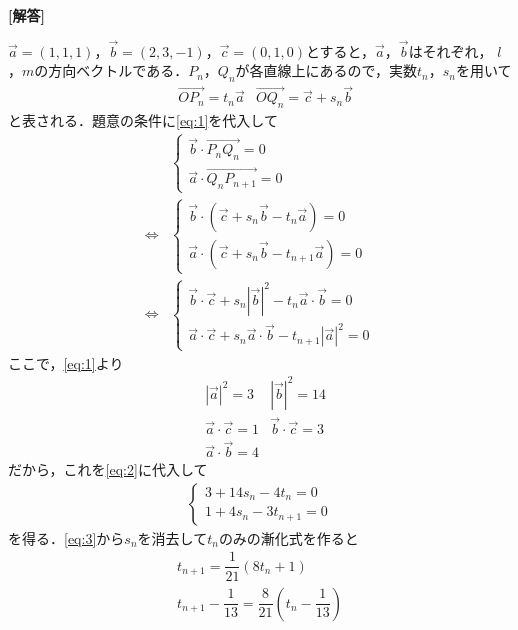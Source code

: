 \documentclass[../../main.tex]{subfiles}
\begin{document}
\begin{oframed}
  
\end{oframed}

{\bf [解答]}

$\vec{a}=(1,1,1)$，$\vec{b}=(2,3,-1)$，$\vec{c}=(0,1,0)$とすると，$\vec{a}$，$\vec{b}$はそれぞれ，
$l$，$m$の方向ベクトルである．$P_n$，$Q_n$が各直線上にあるので，実数$t_n$，$s_n$を用いて
\begin{align}
  &\overrightarrow{OP_n}=t_n\vec{a}&\overrightarrow{OQ_n}=\vec{c}+s_n\vec{b} \label{eq:1}
\end{align}
と表される．題意の条件に\cref{eq:1}を代入して
\begin{align}
  &
  \begin{cases}\displaystyle
    \vec{b}\cdot\overrightarrow{P_nQ_n}=0 \\
    \vec{a}\cdot\overrightarrow{Q_nP_{n+1}}=0
  \end{cases}\nonumber \\
  \Longleftrightarrow
  &
  \begin{cases}\displaystyle
    \vec{b}\cdot(\vec{c}+s_n\vec{b}-t_n\vec{a})=0 \\
    \vec{a}\cdot(\vec{c}+s_n\vec{b}-t_{n+1}\vec{a})=0
  \end{cases}\nonumber \\
  \Longleftrightarrow
  &
  \begin{cases}\displaystyle
    \vec{b}\cdot\vec{c}+s_n|\vec{b}|^2-t_n\vec{a}\cdot\vec{b}=0 \\
    \vec{a}\cdot\vec{c}+s_n\vec{a}\cdot\vec{b}-t_{n+1}|\vec{a}|^2=0
  \end{cases}\label{eq:2}
\end{align}
ここで，\cref{eq:1}より
\begin{align}
  &|\vec{a}|^2=3&|\vec{b}|^2=14 \\
  &\vec{a}\cdot\vec{c}=1&\vec{b}\cdot\vec{c}=3 \\
  &\vec{a}\cdot\vec{b}=4
\end{align}
だから，これを\cref{eq:2}に代入して
\begin{align}
  \begin{cases}\displaystyle
    3+14s_n-4t_n=0 \\
    1+4s_n-3t_{n+1}=0
  \end{cases}\label{eq:3}
\end{align}
を得る．\cref{eq:3}から$s_n$を消去して$t_n$のみの漸化式を作ると
\begin{align}
  t_{n+1}=\dfrac{1}{21}(8t_n+1) \\
  t_{n+1}-\dfrac{1}{13}=\dfrac{8}{21}\left(t_n-\dfrac{1}{13}\right)
\end{align}
\end{document}
